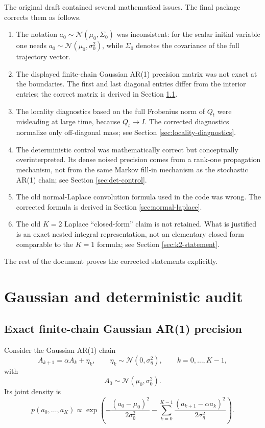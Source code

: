 \documentclass[11pt,a4paper]{article}
\begin{document}
The original draft contained several mathematical issues. The final package corrects them as follows.
\begin{enumerate}[leftmargin=1.45em,itemsep=0.25em]
\item The notation $a_0 \sim \mathcal N(\mu_0,\Sigma_0)$ was inconsistent: for the scalar initial variable one needs $a_0 \sim \mathcal N(\mu_0,\sigma_0^2)$, while $\Sigma_0$ denotes the covariance of the full trajectory vector.
\item The displayed finite-chain Gaussian AR(1) precision matrix was not exact at the boundaries. The first and last diagonal entries differ from the interior entries; the correct matrix is derived in Section \ref{sec:gaussian-precision}.
\item The locality diagnostics based on the full Frobenius norm of $Q_t$ were misleading at large time, because $Q_t \to I$. The corrected diagnostics normalize only off-diagonal mass; see Section \ref{sec:locality-diagnostics}.
\item The deterministic control was mathematically correct but conceptually overinterpreted. Its dense noised precision comes from a rank-one propagation mechanism, not from the same Markov fill-in mechanism as the stochastic AR(1) chain; see Section \ref{sec:det-control}.
\item The old normal-Laplace convolution formula used in the code was wrong. The corrected formula is derived in Section \ref{sec:normal-laplace}.
\item The old $K=2$ Laplace ``closed-form'' claim is not retained. What is justified is an exact nested integral representation, not an elementary closed form comparable to the $K=1$ formula; see Section \ref{sec:k2-statement}.
\end{enumerate}

The rest of the document proves the corrected statements explicitly.

\section{Gaussian and deterministic audit}

\subsection{Exact finite-chain Gaussian AR(1) precision}
\label{sec:gaussian-precision}

Consider the Gaussian AR(1) chain
\begin{equation}
A_{k+1} = \alpha A_k + \eta_k,
\qquad
\eta_k \sim \mathcal N(0,\sigma_\eta^2),
\qquad
k=0,\dots,K-1,
\label{eq:gaussian-ar1}
\end{equation}
with
\begin{equation}
A_0 \sim \mathcal N(\mu_0,\sigma_0^2).
\label{eq:a0-gaussian}
\end{equation}
Its joint density is
\begin{equation}
p(a_0,\dots,a_K)
\propto
\exp\!\left(
-\frac{(a_0-\mu_0)^2}{2\sigma_0^2}
-\sum_{k=0}^{K-1}\frac{(a_{k+1}-\alpha a_k)^2}{2\sigma_\eta^2}
\right).
\label{eq:joint-gaussian-chain}
\end{equation}
\end{document}
